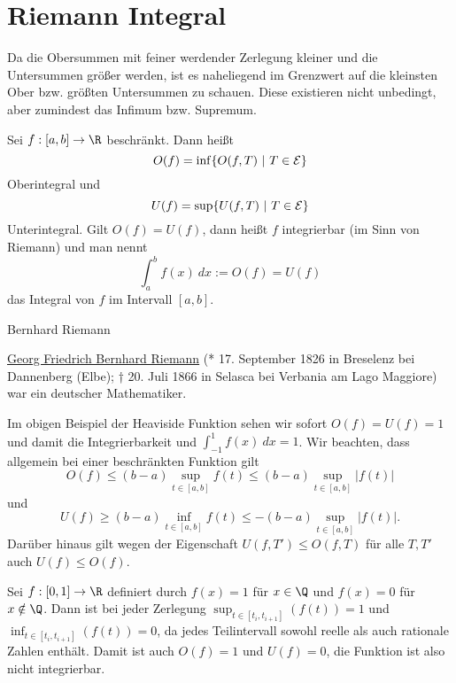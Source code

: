 \documentclass[letterpaper,10pt,english]{jupyterBook}
\begin{document}
\section{Riemann Integral}
\label{\detokenize{integration/riemann:riemann-integral}}\label{\detokenize{integration/riemann::doc}}
Da die Obersummen mit feiner werdender Zerlegung kleiner und die Untersummen größer werden, ist es naheliegend im Grenzwert auf die kleinsten Ober  bzw. größten Untersummen zu schauen. Diese existieren nicht unbedingt, aber zumindest das Infimum bzw. Supremum.
\label{integration/riemann:definition-0}
\begin{definition}{}{}



Sei \(f:[a,b] \rightarrow \R\) beschränkt. Dann heißt
\begin{equation*}
 O(f) = \inf\{ O(f,T)~|~ T \in {\cal E} \}\end{equation*}
Oberintegral und
\begin{equation*}
 U(f) =  \sup\{ U(f,T)~|~ T \in {\cal E} \}\end{equation*}
Unterintegral.
Gilt \(O(f) = U(f)\), dann heißt \(f\) integrierbar (im Sinn von Riemann) und man nennt
\begin{equation*}
 \int_a^b f(x)~dx := O(f) = U(f)
\end{equation*}
das Integral von \(f\) im Intervall \([a,b]\).
\end{definition}

\begin{emphBox}{Bernhard Riemann}{}

\href{https://de.wikipedia.org/wiki/Bernhard\_Riemann}{Georg Friedrich Bernhard Riemann} (* 17. September 1826 in Breselenz bei Dannenberg (Elbe); † 20. Juli 1866 in Selasca bei Verbania am Lago Maggiore) war ein deutscher Mathematiker.
\end{emphBox}

Im obigen Beispiel der Heaviside Funktion sehen wir sofort \(O(f)=U(f)=1\) und damit die Integrierbarkeit und
\(\int_{-1}^1 f(x)~dx = 1\).
Wir beachten, dass allgemein bei einer beschränkten Funktion gilt
\begin{equation*}
O(f) \leq (b-a) \sup_{t \in [a,b]}f(t) \leq  (b-a) \sup_{t \in [a,b]} \vert f(t) \vert
\end{equation*}
und
\begin{equation*}
U(f) \geq (b-a) \inf_{t \in [a,b]}f(t) \leq -  (b-a) \sup_{t \in [a,b]} \vert f(t) \vert .
\end{equation*}
Darüber hinaus gilt wegen der Eigenschaft \(U(f,T') \leq O(f,T)\) für alle \(T,T'\) auch \(U(f) \leq O(f)\).
\label{integration/riemann:example-1}
\begin{example}{}{}



Sei \(f:[0,1] \rightarrow \R\) definiert durch \(f(x) =1\) für \(x\in \Q\) und \(f(x)=0\) für \(x \notin \Q\). Dann ist bei jeder Zerlegung \(\sup_{t \in [t_i,t_{i+1}]}(f(t)) =1\) und \(\inf_{t \in [t_i,t_{i+1}]}(f(t))=0\), da jedes Teilintervall sowohl reelle als auch rationale Zahlen enthält. Damit ist auch \(O(f)=1\) und \(U(f) =0\), die Funktion ist also nicht integrierbar.
\end{example}
\end{document}
